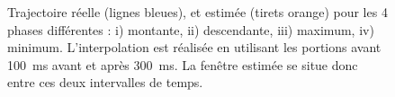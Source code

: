 \begin{figure} [h]
	\shorthandon{;} 
    \caption{Trajectoire réelle (lignes bleues), et estimée (tirets orange) pour les 4 phases différentes : i) montante, ii) descendante, iii) maximum, iv) minimum. L'interpolation est réalisée en utilisant les portions avant \SI{100}{\milli\second} avant et après \SI{300}{\milli\second}. La fenêtre estimée se situe donc entre ces deux intervalles de temps.}
    \label{fig_traj_spline_evaluation}
\end{figure}